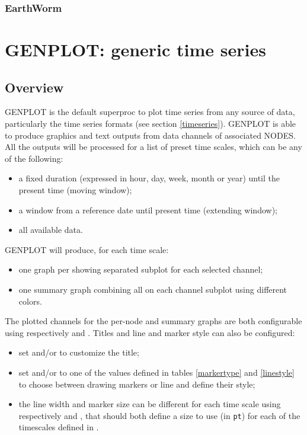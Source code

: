 \subsubsection{EarthWorm}



\section{GENPLOT: generic time series}
\label{genplot}

\subsection{Overview}

GENPLOT is the default superproc to plot time series from any source of data, particularly the time series formats (see section \ref{timeseries}). GENPLOT is able to produce graphics and text outputs from data channels of associated NODES. All the outputs will be processed for a list of preset time scales, which can be any of the following:
\begin{itemize}
\item a fixed duration (expressed in hour, day, week, month or year) until the present time (moving window);
\item a window from a reference date until present time (extending window);
\item all available data.
\end{itemize}

GENPLOT will produce, for each time scale:
\begin{itemize}
\item one graph per  showing separated subplot for each selected channel;
\item one summary graph combining all  on each channel subplot using different colors.
\end{itemize}

The plotted channels for the per-node and summary graphs are both configurable
using respectively  and . Titles and
line and marker style can also be configured:
\begin{itemize}
\item set  and/or  to customize the title;
\item set  and/or  to one of the
  values defined in tables \ref{markertype} and \ref{linestyle} to choose
  between drawing markers or line and define their style;
\item the line width and marker size can be different for each time scale using
  respectively  and , that should both
  define a size to use (in \texttt{pt}) for each of the timescales defined in
  .
\end{itemize}

